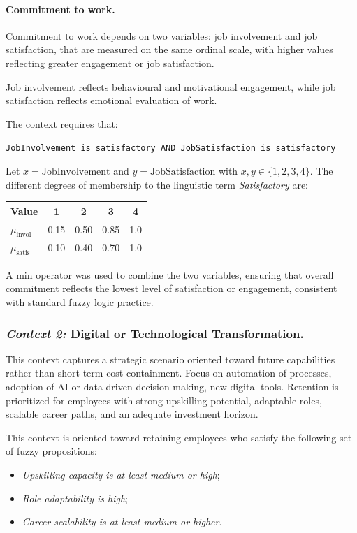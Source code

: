 \documentclass[runningheads]{llncs}
\begin{document}
\paragraph{Commitment to work.}
Commitment to work depends on two variables: job involvement and job satisfaction, that are measured on the same ordinal scale, with higher values reflecting greater engagement or job satisfaction.

Job involvement  reflects behavioural and motivational engagement, while job satisfaction reflects emotional evaluation of work. 

The context requires that:
\begin{center}
    \texttt{JobInvolvement is satisfactory AND JobSatisfaction is satisfactory}
\end{center}

Let $x = \text{JobInvolvement}$ and $y = \text{JobSatisfaction}$ with $x,y \in \{1,2,3,4\}$. 
The different degrees of membership to the linguistic term \textit{Satisfactory} are:
\begin{center}
\begin{tabular}{|l|c|c|c|c|}
\hline
Value & 1 & 2 & 3 & 4 \\
\hline
$\mu_{\text{invol}}$ & 0.15 & 0.50 & 0.85 & 1.0 \\
\hline
$\mu_{\text{satis}}$ & 0.10 & 0.40 & 0.70 & 1.0 \\
\hline
\end{tabular}
\end{center}

A min operator was used to combine the two variables, ensuring that overall commitment reflects the lowest level of satisfaction or engagement, consistent with standard fuzzy logic practice.
\subsubsection*{\textit{Context 2:} Digital or Technological Transformation.}
\label{app:digital_transformation}

This context captures a strategic scenario oriented toward future capabilities rather than short-term cost containment. Focus on automation of processes, adoption of AI or data-driven decision-making, new digital tools.
Retention is prioritized for employees with strong upskilling potential, adaptable roles, scalable career paths,
and an adequate investment horizon.

This context is oriented toward retaining employees who satisfy the following set of fuzzy propositions:
\begin{itemize}
    \item \textit{Upskilling capacity is at least medium or high}; 
    \item \textit{Role adaptability is high};
        \item \textit{Career scalability is at least medium or higher}.
\end{itemize}
\end{document}
